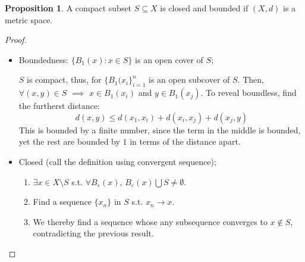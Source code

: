 \documentclass[12pt]{article}
\theoremstyle{definition}
\newtheorem{proposition}[theorem]{Proposition}
\theoremstyle{plain}
\begin{document}
\begin{proposition}
    A compact subset $S\subseteq X$ is closed and bounded if $(X,d)$ is a metric
    space.
    \begin{proof}
        \begin{itemize}
            \item Boundedness: $\{B_1(x): x \in S\}$ is an open cover of $S$;

                $S$ is compact, thus, for $\{B_1(x_i\}_{i=1}^n$ is an open
                subcover of $S$. Then, $\forall(x,y) \in S$ $\implies$ $x
                \in B_1(x_i)$ and $y \in B_1(x_j)$. To reveal boundless,
                find the furtherst distance:
                \[
                    d(x,y) \le d(x_1, x_i) + d(x_i, x_j) + d(x_j, y)
                \]
                This is bounded by a finite number, since the term in the
                middle is bounded, yet the rest are bounded by $1$ in terms
                of the distance apart.

            \item Closed (call the definition using convergent sequence);
                \begin{enumerate}
                    \item $\exists x\in X \setminus S$ s.t. $\forall
                        B_\varepsilon(x)$, $B_\varepsilon(x) \bigcup S \not =
                        \emptyset$.
                    \item Find a sequence $\{x_n\}$ in $S$ s.t. $x_n \to x$.
                    \item We thereby find a sequence whose any subsequence
                        converges to $x \notin S$, contradicting the previous
                        result.
                \end{enumerate}
        \end{itemize}
    \end{proof}
\end{proposition}





\end{document}
